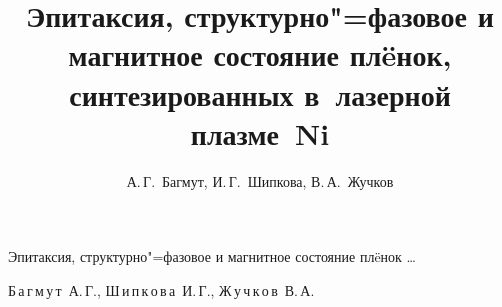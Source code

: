 


% 

%

% 

%





\renewcommand{\firstpage}{200}

\renewcommand{\lastpage}{208}
















\title{Эпитаксия, структурно"=фазовое и магнитное состояние пл\"eнок, синтезированных в~лазерной плазме~N\lowercase{i}}%

{Эпитаксия, структурно"=фазовое и магнитное состояние пл\"eнок \dots}%



\author{А.\,Г.~Багмут, И.\,Г.~Шипкова, В.\,А.~Жучков}%

{Б\,а\,г\,м\,у\,т~А.\,Г., Ш\,и\,п\,к\,о\,в\,а~И.\,Г., Ж\,у\,ч\,к\,о\,в~В.\,А.}%











